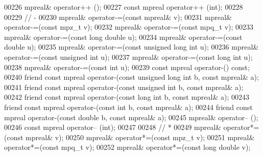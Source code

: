 \begin{DoxyCode}
00226     mpreal& operator++ ();
00227     \textcolor{keyword}{const} mpreal  operator++ (\textcolor{keywordtype}{int});
00228 
00229     \textcolor{comment}{// -}
00230     mpreal& operator-=(\textcolor{keyword}{const} mpreal& v);
00231     mpreal& operator-=(\textcolor{keyword}{const} mpz\_t v);
00232     mpreal& operator-=(\textcolor{keyword}{const} mpq\_t v);
00233     mpreal& operator-=(\textcolor{keyword}{const} \textcolor{keywordtype}{long} \textcolor{keywordtype}{double} u);
00234     mpreal& operator-=(\textcolor{keyword}{const} \textcolor{keywordtype}{double} u);
00235     mpreal& operator-=(\textcolor{keyword}{const} \textcolor{keywordtype}{unsigned} \textcolor{keywordtype}{long} \textcolor{keywordtype}{int} u);
00236     mpreal& operator-=(\textcolor{keyword}{const} \textcolor{keywordtype}{unsigned} \textcolor{keywordtype}{int} u);
00237     mpreal& operator-=(\textcolor{keyword}{const} \textcolor{keywordtype}{long} \textcolor{keywordtype}{int} u);
00238     mpreal& operator-=(\textcolor{keyword}{const} \textcolor{keywordtype}{int} u);
00239     \textcolor{keyword}{const} mpreal operator-() \textcolor{keyword}{const};
00240     \textcolor{keyword}{friend} \textcolor{keyword}{const} mpreal operator-(\textcolor{keyword}{const} \textcolor{keywordtype}{unsigned} \textcolor{keywordtype}{long} \textcolor{keywordtype}{int} b, \textcolor{keyword}{const} mpreal& a);
00241     \textcolor{keyword}{friend} \textcolor{keyword}{const} mpreal operator-(\textcolor{keyword}{const} \textcolor{keywordtype}{unsigned} \textcolor{keywordtype}{int} b,      \textcolor{keyword}{const} mpreal& a);
00242     \textcolor{keyword}{friend} \textcolor{keyword}{const} mpreal operator-(\textcolor{keyword}{const} \textcolor{keywordtype}{long} \textcolor{keywordtype}{int} b,          \textcolor{keyword}{const} mpreal& a);
00243     \textcolor{keyword}{friend} \textcolor{keyword}{const} mpreal operator-(\textcolor{keyword}{const} \textcolor{keywordtype}{int} b,               \textcolor{keyword}{const} mpreal& a);
00244     \textcolor{keyword}{friend} \textcolor{keyword}{const} mpreal operator-(\textcolor{keyword}{const} \textcolor{keywordtype}{double} b,            \textcolor{keyword}{const} mpreal& a);
00245     mpreal& operator-- ();
00246     \textcolor{keyword}{const} mpreal  operator-- (\textcolor{keywordtype}{int});
00247 
00248     \textcolor{comment}{// *}
00249     mpreal& operator*=(\textcolor{keyword}{const} mpreal& v);
00250     mpreal& operator*=(\textcolor{keyword}{const} mpz\_t v);
00251     mpreal& operator*=(\textcolor{keyword}{const} mpq\_t v);
00252     mpreal& operator*=(\textcolor{keyword}{const} \textcolor{keywordtype}{long} \textcolor{keywordtype}{double} v);

\end{DoxyCode}
